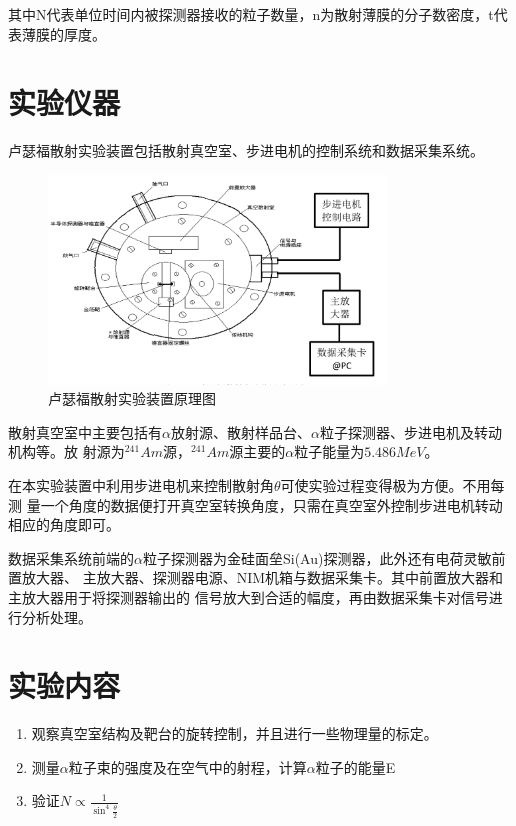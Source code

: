 \documentclass[a4paper,UTF8]{ctexart}
\begin{document}
其中N代表单位时间内被探测器接收的粒子数量，n为散射薄膜的分子数密度，t代表薄膜的厚度。

\section{实验仪器}

卢瑟福散射实验装置包括散射真空室、步进电机的控制系统和数据采集系统。

\begin{figure}[H]
    \centering
    \begin{minipage}[b]{0.9\textwidth}
        \centering
        \includegraphics[width=0.8\textwidth]{./fig_apparatus.png}
        \caption{卢瑟福散射实验装置原理图}
    \end{minipage}
\end{figure}

散射真空室中主要包括有$\alpha$放射源、散射样品台、$\alpha$粒子探测器、步进电机及转动机构等。放
射源为$^{241}Am$源，$^{241}Am$源主要的$\alpha$粒子能量为$5.486MeV$。

在本实验装置中利用步进电机来控制散射角$\theta$可使实验过程变得极为方便。不用每测
量一个角度的数据便打开真空室转换角度，只需在真空室外控制步进电机转动相应的角度即可。

数据采集系统前端的$\alpha$粒子探测器为金硅面垒Si(Au)探测器，此外还有电荷灵敏前置放大器、
主放大器、探测器电源、NIM机箱与数据采集卡。其中前置放大器和主放大器用于将探测器输出的
信号放大到合适的幅度，再由数据采集卡对信号进行分析处理。

\section{实验内容}

\begin{enumerate}
    \item 观察真空室结构及靶台的旋转控制，并且进行一些物理量的标定。
    \item 测量$\alpha$粒子束的强度及在空气中的射程，计算$\alpha$粒子的能量E
    \item 验证$N \propto \frac{1}{\sin^4{\frac{\theta}{2}}}$
\end{enumerate}
\end{document}
